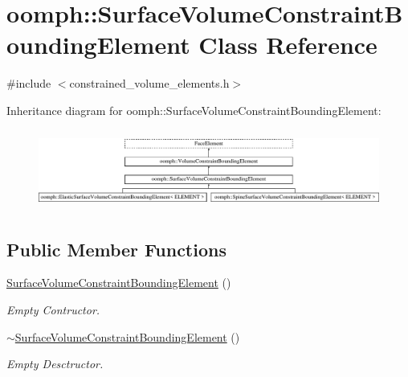\hypertarget{classoomph_1_1SurfaceVolumeConstraintBoundingElement}{}\section{oomph\+:\+:Surface\+Volume\+Constraint\+Bounding\+Element Class Reference}
\label{classoomph_1_1SurfaceVolumeConstraintBoundingElement}


{\ttfamily \#include $<$constrained\+\_\+volume\+\_\+elements.\+h$>$}

Inheritance diagram for oomph\+:\+:Surface\+Volume\+Constraint\+Bounding\+Element\+:\begin{figure}[H]
\begin{center}
\leavevmode
\includegraphics[height=2.647754cm]{classoomph_1_1SurfaceVolumeConstraintBoundingElement}
\end{center}
\end{figure}
\subsection*{Public Member Functions}
\begin{DoxyCompactItemize}
\item 
\hyperlink{classoomph_1_1SurfaceVolumeConstraintBoundingElement_a1dc9bb792bbce8f69f063a33934fc84e}{Surface\+Volume\+Constraint\+Bounding\+Element} ()
\begin{DoxyCompactList}\small\item\em Empty Contructor. \end{DoxyCompactList}\item 
\hyperlink{classoomph_1_1SurfaceVolumeConstraintBoundingElement_a9545195abf877c791208081022f30672}{$\sim$\+Surface\+Volume\+Constraint\+Bounding\+Element} ()
\begin{DoxyCompactList}\small\item\em Empty Desctructor. \end{DoxyCompactList}\end{DoxyCompactItemize}
